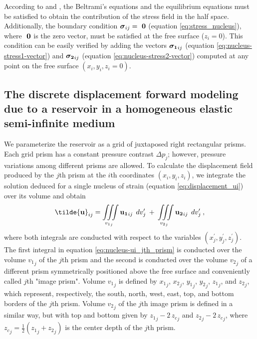 \documentclass[journal abbreviation, manuscript]{copernicus}
\begin{document}
According to \cite{Sharma56} and \cite{Tempone10}, the Beltrami’s equations \citep{Beltrami} and the equilibrium equations must be satisfied to obtain the contribution of the stress field in the half space. 
Additionally, the boundary condition 
$\mbox{\boldmath$\sigma$}_{ij} = \mbox{ \boldmath$0$}$ (equation \ref{eq:stress_nucleus}), where $\mbox{ \boldmath$0$}$ is the zero vector, must be satisfied at the free surface ($z_i = 0$).
This condition can be easily verified by adding the vectors 
$\mbox{\boldmath$\sigma_{1}$}_{ij}$ (equation \ref{eq:nucleus-stress1-vector}) and 
$\mbox{\boldmath$\sigma_{2}$}_{ij}$ (equation \ref{eq:nucleus-stress2-vector}) 
computed at any point on the free surface $(x_i, y_i, z_i = 0)$.


\subsection{The discrete displacement forward modeling due to a reservoir in a homogeneous elastic semi-infinite medium} \label{u-model}


We parameterize the reservoir as a grid of juxtaposed right rectangular prisms.
Each grid prism has a constant pressure contrast $\Delta p_{j}$; however, pressure variations among different prisms are allowed. 
To calculate the displacement field produced by the $j$th prism
at the $i$th coordinates  $(x_i, y_i, z_i)$, we integrate the solution deduced for a single nucleus of strain (equation \ref{eq:displacement_ui})
over its volume and obtain
\begin{equation}
{\bf{\tilde{u}}}_{ij} = 
\iiint\limits_{{v_{1}}_{j}}
{\bf{u_{1}}}_{ij} \: \:  dv_{j}^{\prime}
\: + \:
\iiint\limits_{{v_{2}}_{j}}
{\bf{u_{2}}}_{ij} \:\:  dv_{j}^{\prime} \: ,
\label{eq:nucleus-ui_jth_prism}
\end{equation}
where both integrals are conducted with respect to the variables 
$(x^{\prime}_{j}, y^{\prime}_{j}, z^{\prime}_{j})$. The first integral in equation 
\ref{eq:nucleus-ui_jth_prism} is conducted over the volume ${v_{1}}_{j}$ of the $j$th
prism and the second is conducted over the volume 
${v_{2}}_{j}$ of a different prism symmetrically positioned above the free surface 
and conveniently called $j$th "image prism".
Volume ${v_{1}}_{j}$ is defined by ${x_1}_{j}$, ${x_2}_{j}$, ${y_1}_{j}$, ${y_2}_{j}$,
${z_1}_{j}$, and ${z_2}_{j}$, which represent, respectively, the south, north, west, 
east, top, and bottom borders of the $j$th prism.
Volume ${v_{2}}_{j}$ of the $j$th image prism is defined in a similar way, but with 
top and bottom given by ${z_1}_{j} - 2 \, {z_c}_{j}$ and ${z_2}_{j} - 2 \, {z_c}_{j}$, where 
${z_c}_{j} = \frac{1}{2}({z_1}_{j} + {z_2}_{j})$ is the center depth of the $j$th prism.
\end{document}
